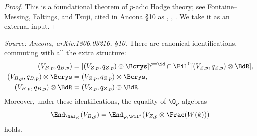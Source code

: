 \begin{proof}
  This is a foundational theorem of \(p\)-adic Hodge theory; see
  Fontaine--Messing, Faltings, and Tsuji, cited in Ancona \S10 as
  \cite{FontMess}, \cite{Falt}, \cite{CF}. We take it as an external input.
\end{proof}

\begin{corollary}
  \label{cor:crys-identifications}
  \textit{Source: Ancona, arXiv:1806.03216, \S10.}
  There are canonical identifications, commuting with all the extra structure:
  \begin{align}
    (V_{B,p}, q_{B,p}) &= [(V_{Z,p}, q_{Z,p}) \otimes \Bcrys]^{\varphi=\id}
      \cap \Fil^0[(V_{Z,p}, q_{Z,p}) \otimes \BdR], \\
    (V_{B,p}, q_{B,p}) \otimes \Bcrys &= (V_{Z,p}, q_{Z,p}) \otimes \Bcrys, \\
    (V_{B,p}, q_{B,p}) \otimes \BdR &= (V_{Z,p}, q_{Z,p}) \otimes \BdR.
  \end{align}
  Moreover, under these identifications, the equality of \(\Q_p\)-algebras
  \[\End_{\Gal_K}(V_{B,p}) = \End_{\varphi,\Fil^*}(V_{Z,p} \otimes \Frac(W(k)))\]
  holds.
\end{corollary}

